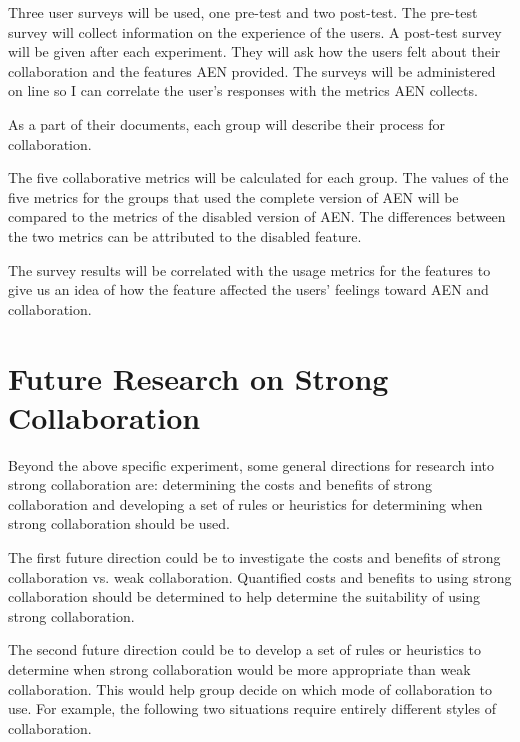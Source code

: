 
Three user surveys will be used, one pre-test and two post-test.  The
pre-test survey will collect information on the experience of the users.  A
post-test survey will be given after each experiment.  They will ask how
the users felt about their collaboration and the features AEN provided.
The surveys will be administered on line so I can correlate the user's
responses with the metrics AEN collects.

As a part of their documents, each group will describe their process for
collaboration. 


The five collaborative metrics will be calculated for each group.  The
values of the five metrics for the groups that used the complete version of
AEN will be compared to the metrics of the disabled version of AEN.  The
differences between the two metrics can be attributed to the disabled
feature.

The survey results will be correlated with the usage metrics for the
features to give us an idea of how the feature affected the users' feelings
toward AEN and collaboration.

\section{Future Research on Strong Collaboration}
\label{sec:research}

Beyond the above specific experiment, some general directions for research
into strong collaboration are: determining the costs and benefits of
strong collaboration and developing a set of rules or heuristics for
determining when strong collaboration should be used.  

The first future direction could be to investigate the costs and benefits
of strong collaboration vs. weak collaboration.  Quantified costs and
benefits to using strong collaboration should be determined to help
determine the suitability of using strong collaboration.  

The second future direction could be to develop a set of rules or
heuristics to determine when strong collaboration would be more appropriate
than weak collaboration.  This would help group decide on which mode of
collaboration to use.  For example, the following two situations require
entirely different styles of collaboration.

